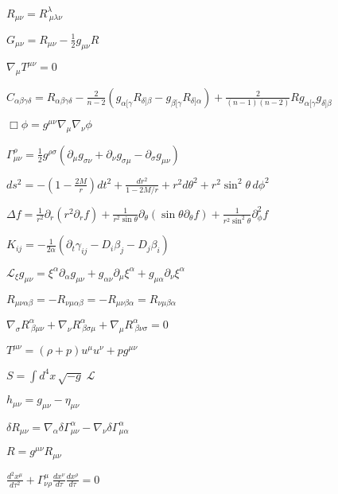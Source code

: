 $R_{\mu\nu} = R^{\lambda}_{\ \mu\lambda\nu}$

$G_{\mu\nu} = R_{\mu\nu} - \frac{1}{2} g_{\mu\nu} R$

$\nabla_\mu T^{\mu\nu} = 0$

$
C_{\alpha\beta\gamma\delta} =
R_{\alpha\beta\gamma\delta}
- \frac{2}{n-2} \left(
    g_{\alpha[\gamma} R_{\delta]\beta}
    - g_{\beta[\gamma} R_{\delta]\alpha}
  \right)
+ \frac{2}{(n-1)(n-2)} R g_{\alpha[\gamma} g_{\delta]\beta}
$

$
\Box \phi = g^{\mu\nu} \nabla_\mu \nabla_\nu \phi
$

$
\Gamma^\rho_{\mu\nu} = \frac{1}{2} g^{\rho\sigma}
\left(
  \partial_\mu g_{\sigma\nu} + \partial_\nu g_{\sigma\mu} - \partial_\sigma g_{\mu\nu}
\right)
$

$
ds^2 = -\left(1-\frac{2M}{r}\right) dt^2 + \frac{dr^2}{1-2M/r} + r^2 d\theta^2 + r^2 \sin^2\theta\, d\phi^2
$

$
\Delta f = \frac{1}{r^2} \partial_r \left( r^2 \partial_r f \right)
+ \frac{1}{r^2\sin\theta} \partial_\theta \left( \sin\theta \partial_\theta f \right)
+ \frac{1}{r^2 \sin^2\theta} \partial^2_\phi f
$

$
K_{ij} = -\frac{1}{2\alpha} \left( \partial_t \gamma_{ij} - D_i \beta_j - D_j \beta_i \right)
$

$
\mathcal{L}_\xi g_{\mu\nu} = \xi^\alpha \partial_\alpha g_{\mu\nu} + g_{\alpha\nu} \partial_\mu \xi^\alpha + g_{\mu\alpha} \partial_\nu \xi^\alpha
$

$
R_{\mu\nu\alpha\beta} = -R_{\nu\mu\alpha\beta} = -R_{\mu\nu\beta\alpha} = R_{\nu\mu\beta\alpha}
$

$
\nabla_\sigma R^{\alpha}_{\ \beta\mu\nu}
+ \nabla_\nu R^{\alpha}_{\ \beta\sigma\mu}
+ \nabla_\mu R^{\alpha}_{\ \beta\nu\sigma} = 0
$

$
T^{\mu\nu} = (\rho + p) u^\mu u^\nu + p g^{\mu\nu}
$

$
S = \int d^4x \, \sqrt{-g}\; \mathcal{L}
$

$
h_{\mu\nu} = g_{\mu\nu} - \eta_{\mu\nu}
$

$
\delta R_{\mu\nu} = \nabla_\alpha \delta \Gamma^\alpha_{\mu\nu} - \nabla_\nu \delta \Gamma^\alpha_{\mu\alpha}
$

$
R = g^{\mu\nu} R_{\mu\nu}
$

$
\frac{d^2x^\mu}{d\tau^2} + \Gamma^\mu_{\nu\rho} \frac{dx^\nu}{d\tau} \frac{dx^\rho}{d\tau} = 0
$
